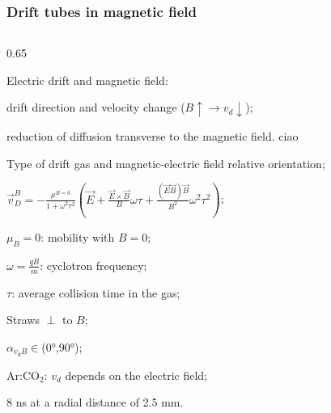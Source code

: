 \documentclass{beamer}
\begin{document}
\begin{frame}
    \frametitle{Drift tubes in magnetic field}

    \vspace{-3mm}
    \begin{columns}
        \begin{column}{0.65\framewidth}
            \setlength{\leftmargini}{1.1em}
            
            \begin{itemize}
            
              {\footnotesize \item Electric drift and magnetic field: }
               \begin{itemize}
                {\footnotesize       
                \item drift direction and velocity change ($ B \uparrow \rightarrow v_d \downarrow $); 
                \item reduction of diffusion transverse to the magnetic field.  ciao
                } 
            \end{itemize}

            
               {\footnotesize
               \vspace{1mm}
		\item Type of drift gas and magnetic-electric field relative orientation;
                \vspace{1mm}
                \item $\vec{v}_D^B=-\frac{\mu^{B=0}}{1+\omega^2 \tau^2}\left(\vec{E}+\frac{\vec{E} \times \vec{B}}{B} \omega \tau+\frac{(\vec{E} \vec{B}) \vec{B}}{B^2} \omega^2 \tau^2\right)$;
               \vspace{1mm}
               \item $\mu_B = 0$: mobility with $B=0$;
               \vspace{1mm}
                \item $\omega = \frac{qB}{m}$: cyclotron frequency; 
                \vspace{1mm}
               \item $\tau$: average collision time in the gas;
                \vspace{1mm}
                \item Straws $\perp$ to $B$;
                \vspace{1mm}
                \item $\alpha_{v_d B} \in $(0°,90°);
                \vspace{1mm}
                \item Ar:CO$_2$: $v_{d}$ depends on the electric field;
               \vspace{1mm}
                \item 8 ns at a radial distance of 2.5 mm.}
              

\end{itemize}
\end{column}
\end{columns}
\end{frame}
\end{document}
